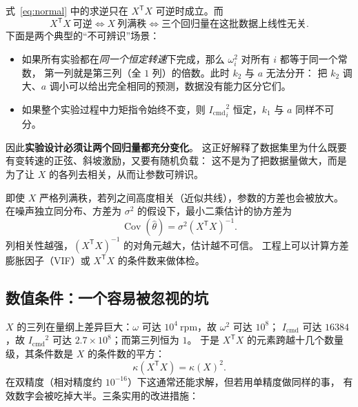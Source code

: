 \documentclass[cn,blue,11pt,device=normal]{elegantnote}
\newcommand{\Icmd}{I_{\mathrm{cmd}}{}}
\newcommand{\fref}[1]{式~\eqref{#1}}
\begin{document}
\fref{eq:normal} 中的求逆只在 $X^{\mathsf T}X$ 可逆时成立。而
\begin{equation}
  X^{\mathsf T}X\ \text{可逆} \iff X\ \text{列满秩} \iff
  \text{三个回归量在这批数据上线性无关}.
\end{equation}
下面是两个典型的“不可辨识”场景：
\begin{itemize}
  \item 如果所有实验都在\emph{同一个恒定转速}下完成，那么 $\omega_i^2$ 对所有 $i$ 都等于同一个常数，
  第一列就是第三列（全 $1$ 列）的倍数。此时 $k_2$ 与 $a$ 无法分开：
  把 $k_2$ 调大、$a$ 调小可以给出完全相同的预测，数据没有能力区分它们。
  \item 如果整个实验过程中力矩指令始终不变，则 ${\Icmd}_i^2$ 恒定，$k_1$ 与 $a$ 同样不可分。
\end{itemize}
因此\textbf{实验设计必须让两个回归量都充分变化}。
这正好解释了数据集里为什么既要有变转速的正弦、斜坡激励，又要有随机负载：
这不是为了把数据量做大，而是为了让 $X$ 的各列去相关，从而让参数可辨识。

即使 $X$ 严格列满秩，若列之间高度相关（近似共线），参数的方差也会被放大。
在噪声独立同分布、方差为 $\sigma^2$ 的假设下，最小二乘估计的协方差为
\begin{equation}\label{eq:cov}
  \operatorname{Cov}(\hat\theta) = \sigma^2 (X^{\mathsf T}X)^{-1}.
\end{equation}
列相关性越强，$(X^{\mathsf T}X)^{-1}$ 的对角元越大，估计越不可信。
工程上可以计算方差膨胀因子（VIF）或 $X^{\mathsf T}X$ 的条件数来做体检。

\subsection{数值条件：一个容易被忽视的坑}

$X$ 的三列在量纲上差异巨大：$\omega$ 可达 $10^4\ \mathrm{rpm}$，故 $\omega^2$ 可达 $10^8$；
$\Icmd$ 可达 $16384$，故 $\Icmd^2$ 可达 $2.7\times10^8$；而第三列恒为 $1$。
于是 $X^{\mathsf T}X$ 的元素跨越十几个数量级，其条件数是 $X$ 的条件数的平方：
\begin{equation}
  \kappa(X^{\mathsf T}X) = \kappa(X)^{2}.
\end{equation}
在双精度（相对精度约 $10^{-16}$）下这通常还能求解，但若用单精度做同样的事，
有效数字会被吃掉大半。三条实用的改进措施：
\end{document}
